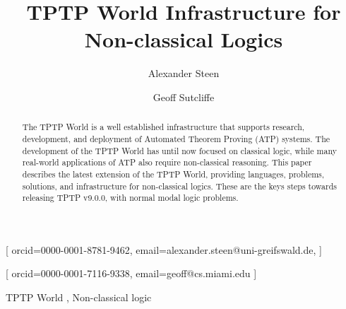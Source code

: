 \documentclass{ceurart}
\begin{document}
\title{TPTP World Infrastructure for Non-classical Logics}

\author[1]{Alexander Steen}[%
orcid=0000-0001-8781-9462,
email=alexander.steen@uni-greifswald.de,
]
\address[1]{University of Greifswald, Germany}
\author[2]{Geoff Sutcliffe}[%
orcid=0000-0001-7116-9338,
email=geoff@cs.miami.edu
]
\address[3]{University of Miami, USA}
\begin{abstract}
The TPTP World is a well established infrastructure that supports research, 
development, and deployment of Automated Theorem Proving (ATP) systems.
The development of the TPTP World has until now focused on classical logic, while many 
real-world applications of ATP also require non-classical reasoning. 
This paper describes the latest extension of the TPTP World, providing languages, problems,
solutions, and infrastructure for non-classical logics.
These are the keys steps towards releasing TPTP v9.0.0, with normal modal logic problems.
\end{abstract}
\begin{keywords}
  TPTP World \sep
  Non-classical logic
\end{keywords}

% 

\maketitle
% 
\end{document}
